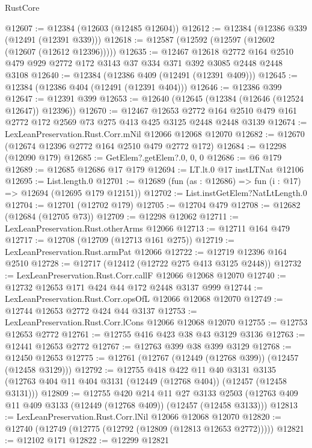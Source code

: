 \begin{lexlean}{RustCore}
\begin{coremodule}
@12607 := @12384 (@12603 (@12485 @12604))
@12612 := @12384 (@12386 @339 (@12491 (@12391 @339)))
@12618 := @12587 (@12592 (@12597 (@12602 (@12607 (@12612 @12396)))))
@12635 := @12467
    @12618
    @2772
    @164
    @2510
    @479
    @929
    @2772
    @172
    @3143
    @37
    @334
    @371
    @392
    @3085
    @2448
    @2448
    @3108
@12640 := @12384 (@12386 @409 (@12491 (@12391 @409)))
@12645 := @12384 (@12386 @404 (@12491 (@12391 @404)))
@12646 := @12386 @399
@12647 := @12391 @399
@12653 := @12640 (@12645 (@12384 (@12646 (@12524 @12647)) @12396))
@12670 := @12467
    @12653
    @2772
    @164
    @2510
    @479
    @161
    @2772
    @172
    @2569
    @73
    @275
    @413
    @425
    @3125
    @2448
    @2448
    @3139
@12674 := LexLeanPreservation.Rust.Corr.mNil @12066 @12068 @12070
@12682 := @12670 (@12674 @12396 @2772 @164 @2510 @479 @2772 @172)
@12684 := @12298 (@12090 @179)
@12685 := GetElem?.getElem?.{0, 0, 0}
@12686 := @6 @179
@12689 := @12685 @12686 @17 @179
@12694 := LT.lt.{0} @17 instLTNat @12106
@12695 := List.length.{0}
@12701 := @12689 (fun (as : @12686) => fun (i : @17) => @12694 (@12695 @179 @12151))
@12702 := List.instGetElem?NatLtLength.{0}
@12704 := @12701 (@12702 @179)
@12705 := @12704 @479
@12708 := @12682 (@12684 (@12705 @73))
@12709 := @12298 @12062
@12711 := LexLeanPreservation.Rust.otherArms @12066
@12713 := @12711 @164 @479
@12717 := @12708 (@12709 (@12713 @161 @275))
@12719 := LexLeanPreservation.Rust.armPat @12066
@12722 := @12719 @12396 @164 @2510
@12728 := @12717 (@12412 (@12722 @275 @413 @3125 @2448))
@12732 := LexLeanPreservation.Rust.Corr.callF @12066 @12068 @12070
@12740 := @12732 @12653 @171 @424 @44 @172 @2448 @3137 @999
@12744 := LexLeanPreservation.Rust.Corr.opsOfL @12066 @12068 @12070
@12749 := @12744 @12653 @2772 @424 @44 @3137
@12753 := LexLeanPreservation.Rust.Corr.lCons @12066 @12068 @12070
@12755 := @12753 @12653 @2772
@12761 := @12755 @416 @423 @38 @43 @3129 @3136
@12763 := @12441 @12653 @2772
@12767 := @12763 @399 @38 @399 @3129
@12768 := @12450 @12653
@12775 := @12761 (@12767 (@12449 (@12768 @399)) (@12457 (@12458 @3129)))
@12792 := @12755
    @418
    @422
    @11
    @40
    @3131
    @3135
    (@12763 @404 @11 @404 @3131 (@12449 (@12768 @404)) (@12457 (@12458 @3131)))
@12809 := @12755
    @420
    @214
    @11
    @27
    @3133
    @2503
    (@12763 @409 @11 @409 @3133 (@12449 (@12768 @409)) (@12457 (@12458 @3133)))
@12813 := LexLeanPreservation.Rust.Corr.lNil @12066 @12068 @12070
@12820 := @12740 (@12749 (@12775 (@12792 (@12809 (@12813 @12653 @2772)))))
@12821 := @12102 @171
@12822 := @12299 @12821

\end{coremodule}
\end{lexlean}
